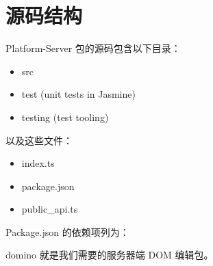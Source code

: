 \section{源码结构}


Platform-Server 包的源码包含以下目录：

\begin{itemize}
  \item src
  \item test (unit tests in Jasmine)
  \item testing (test tooling)
\end{itemize}


以及这些文件：

\begin{itemize}
  \item index.ts
  \item package.json
  \item public\_api.ts
\end{itemize}


Package.json 的依赖项列为：




domino 就是我们需要的服务器端 DOM 编辑包。

